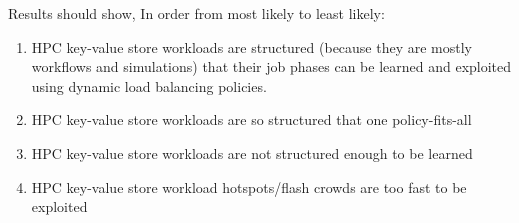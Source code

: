 Results should show, In order from most likely to least likely:

\begin{enumerate}

  \item HPC key-value store workloads are structured (because they are mostly
  workflows and simulations) that their job phases can be learned and exploited
  using dynamic load balancing policies.

  \item HPC key-value store workloads are so structured that one
  policy-fits-all

  \item HPC key-value store workloads are not structured enough to be learned

  \item HPC key-value store workload hotspots/flash crowds are too fast to be
  exploited

\end{enumerate}



%
%
%
%
%
%
%
%
%
%
%
%
%
